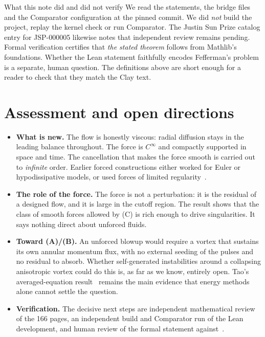 \documentclass[11pt]{article}
\theoremstyle{plain}
\theoremstyle{remark}
\begin{document}
\begin{statusbox}{What this note did and did not verify}
We read the statements, the bridge files and the Comparator configuration at the pinned commit. We did \emph{not} build the project, replay the kernel check or run Comparator. The Justin Sun Prize catalog entry for JSP-000005 likewise notes that independent review remains pending. Formal verification certifies that \emph{the stated theorem} follows from Mathlib's foundations. Whether the Lean statement faithfully encodes Fefferman's problem is a separate, human question. The definitions above are short enough for a reader to check that they match the Clay text.
\end{statusbox}

\section{Assessment and open directions}

\begin{itemize}[itemsep=2pt]
\item \textbf{What is new.} The flow is honestly viscous: radial diffusion stays in the leading balance throughout. The force is $C^\infty$ and compactly supported in space and time. The cancellation that makes the force smooth is carried out to \emph{infinite} order. Earlier forced constructions either worked for Euler or hypodissipative models, or used forces of limited regularity~\cite{CMZ,CMZZ,ABC}.
\item \textbf{The role of the force.} The force is not a perturbation: it is the residual of a designed flow, and it is large in the cutoff region. The result shows that the class of smooth forces allowed by (C) is rich enough to drive singularities. It says nothing direct about unforced fluids.
\item \textbf{Toward (A)/(B).} An unforced blowup would require a vortex that sustains its own annular momentum flux, with no external seeding of the pulses and no residual to absorb. Whether self-generated instabilities around a collapsing anisotropic vortex could do this is, as far as we know, entirely open. Tao's averaged-equation result~\cite{Tao} remains the main evidence that energy methods alone cannot settle the question.
\item \textbf{Verification.} The decisive next steps are independent mathematical review of the 166 pages, an independent build and Comparator run of the Lean development, and human review of the formal statement against~\cite{Fef}.
\end{itemize}
\end{document}
